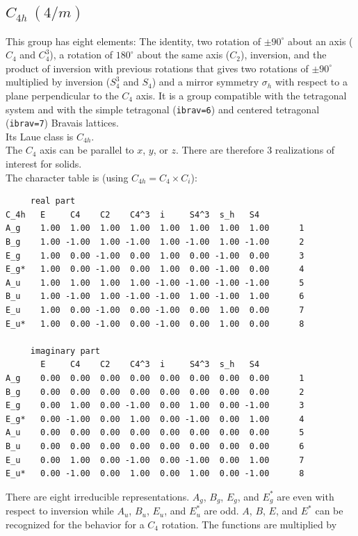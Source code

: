 \documentclass[12pt,a4paper]{article}
\begin{document}
\subsection{\color{web-blue}$C_{4h}\ (4/m)$}  
This group has eight elements: The identity, two rotation of $\pm90^\circ$ 
about an axis ($C_4$ and $C_4^3$), a rotation of $180^\circ$ about the
same axis ($C_2$), inversion, and the product of inversion with previous
rotations that gives two rotations of $\pm90^\circ$ multiplied by inversion 
($S_4^3$ and $S_4$) and a mirror symmetry $\sigma_h$ with respect to a plane 
perpendicular to the $C_4$ axis.  
It is a group compatible with the tetragonal system and with the  
simple tetragonal (\texttt{ibrav=6}) and centered tetragonal (\texttt{ibrav=7})
Bravais lattices. \\ 
Its Laue class is $C_{4h}$. \\
The $C_4$ axis can be parallel to $x$, $y$, or $z$. There are therefore
$3$ realizations of interest for solids. \\
The character table is (using $C_{4h}=C_4 \times C_i$):
\begin{verbatim}
     real part
C_4h   E     C4    C2    C4^3  i     S4^3  s_h   S4   
A_g    1.00  1.00  1.00  1.00  1.00  1.00  1.00  1.00      1
B_g    1.00 -1.00  1.00 -1.00  1.00 -1.00  1.00 -1.00      2
E_g    1.00  0.00 -1.00  0.00  1.00  0.00 -1.00  0.00      3
E_g*   1.00  0.00 -1.00  0.00  1.00  0.00 -1.00  0.00      4
A_u    1.00  1.00  1.00  1.00 -1.00 -1.00 -1.00 -1.00      5
B_u    1.00 -1.00  1.00 -1.00 -1.00  1.00 -1.00  1.00      6
E_u    1.00  0.00 -1.00  0.00 -1.00  0.00  1.00  0.00      7
E_u*   1.00  0.00 -1.00  0.00 -1.00  0.00  1.00  0.00      8

     imaginary part
       E     C4    C2    C4^3  i     S4^3  s_h   S4   
A_g    0.00  0.00  0.00  0.00  0.00  0.00  0.00  0.00      1
B_g    0.00  0.00  0.00  0.00  0.00  0.00  0.00  0.00      2
E_g    0.00  1.00  0.00 -1.00  0.00  1.00  0.00 -1.00      3
E_g*   0.00 -1.00  0.00  1.00  0.00 -1.00  0.00  1.00      4
A_u    0.00  0.00  0.00  0.00  0.00  0.00  0.00  0.00      5
B_u    0.00  0.00  0.00  0.00  0.00  0.00  0.00  0.00      6
E_u    0.00  1.00  0.00 -1.00  0.00 -1.00  0.00  1.00      7
E_u*   0.00 -1.00  0.00  1.00  0.00  1.00  0.00 -1.00      8
\end{verbatim}
There are eight irreducible representations. $A_g$, $B_g$, $E_g$, and
$E_g^*$ are even with respect to inversion while $A_u$, $B_u$, $E_u$,
and $E_u^*$ are odd. $A$, $B$, $E$, and $E^*$ can be recognized for the
behavior for a $C_4$ rotation. The functions are multiplied by 
\end{document}
